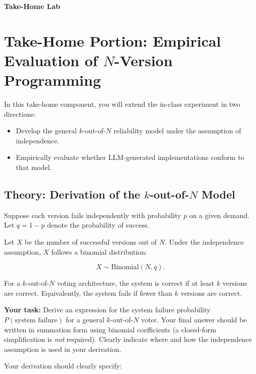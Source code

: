 \setcounter{section}{0}
\setcounter{subsection}{0}
\setcounter{subsubsection}{0}

\clearpage
\begin{center}
  {\Large\bfseries Take-Home Lab}\\[0.5em]
\end{center}
\vspace{1em}

\section{Take-Home Portion: Empirical Evaluation of $N$-Version Programming}

In this take-home component, you will extend the in-class experiment in two directions:

\begin{itemize}
  \item Develop the general $k$-out-of-$N$ reliability model under the assumption of independence.
  \item Empirically evaluate whether LLM-generated implementations conform to that model.
\end{itemize}

\subsection{Theory: Derivation of the $k$-out-of-$N$ Model}

Suppose each version fails independently with probability $p$ on a given demand.
Let $q = 1 - p$ denote the probability of success.

Let $X$ be the number of successful versions out of $N$.
Under the independence assumption, $X$ follows a binomial distribution:

\[
X \sim \text{Binomial}(N, q).
\]

For a $k$-out-of-$N$ voting architecture, the system is correct if at least $k$ versions are correct.
Equivalently, the system fails if fewer than $k$ versions are correct.

\textbf{Your task:}
Derive an expression for the system failure probability $P(\text{system failure})$ for a general $k$-out-of-$N$ voter.
Your final answer should be written in summation form using binomial coefficients (a closed-form simplification is \emph{not} required).
Clearly indicate where and how the independence assumption is used in your derivation.

Your derivation should clearly specify:


